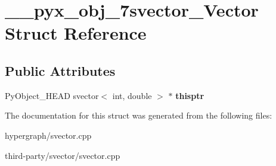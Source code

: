 \hypertarget{struct____pyx__obj__7svector__Vector}{
\section{\_\-\_\-pyx\_\-obj\_\-7svector\_\-Vector Struct Reference}
\label{struct____pyx__obj__7svector__Vector}
}
\subsection*{Public Attributes}
\begin{DoxyCompactItemize}
\item 
\hypertarget{struct____pyx__obj__7svector__Vector_af079a183d80d335744c531c224658a16}{
PyObject\_\-HEAD svector$<$ int, double $>$ $\ast$ {\bfseries thisptr}}
\label{struct____pyx__obj__7svector__Vector_af079a183d80d335744c531c224658a16}

\end{DoxyCompactItemize}


The documentation for this struct was generated from the following files:\begin{DoxyCompactItemize}
\item 
hypergraph/svector.cpp\item 
third-\/party/svector/svector.cpp\end{DoxyCompactItemize}
